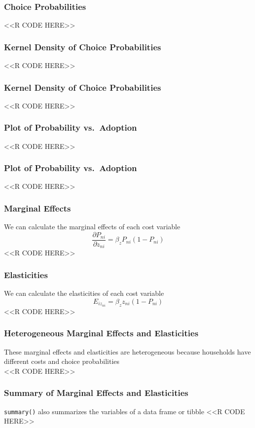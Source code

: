 \documentclass{beamer}
\begin{document}
\begin{frame}[fragile]\frametitle{Choice Probabilities}
    <<R CODE HERE>>
\end{frame}

\begin{frame}[fragile]\frametitle{Kernel Density of Choice Probabilities}
    <<R CODE HERE>>
\end{frame}

\begin{frame}[fragile]\frametitle{Kernel Density of Choice Probabilities}
    <<R CODE HERE>>
\end{frame}

\begin{frame}[fragile]\frametitle{Plot of Probability vs.\ Adoption}
    <<R CODE HERE>>
\end{frame}

\begin{frame}[fragile]\frametitle{Plot of Probability vs.\ Adoption}
    <<R CODE HERE>>
\end{frame}

\begin{frame}[fragile]\frametitle{Marginal Effects}
    We can calculate the marginal effects of each cost variable
    $$\frac{\partial P_{ni}}{\partial z_{ni}} = \beta_z P_{ni} (1 - P_{ni})$$
    <<R CODE HERE>>
\end{frame}

\begin{frame}[fragile]\frametitle{Elasticities}
    We can calculate the elasticities of each cost variable
    $$E_{iz_{ni}} = \beta_z z_{ni} (1 - P_{ni})$$
    <<R CODE HERE>>
\end{frame}

\begin{frame}[fragile]\frametitle{Heterogeneous Marginal Effects and Elasticities}
    These marginal effects and elasticities are heterogeneous because households have different costs and choice probabilities \\
    <<R CODE HERE>>
\end{frame}

\begin{frame}[fragile]\frametitle{Summary of Marginal Effects and Elasticities}
    \texttt{summary()} also summarizes the variables of a data frame or tibble
    <<R CODE HERE>>
\end{frame}
\end{document}
